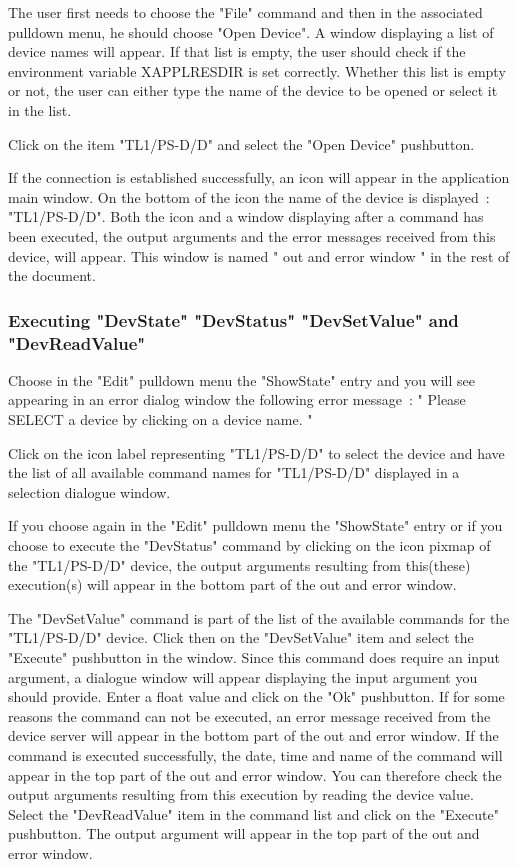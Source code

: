 The user first needs to choose the "File" command and then in the associated
pulldown menu, he should choose "Open Device". 
A window displaying a list of device names will appear. If that list is empty,  
the user should check if the environment variable XAPPLRESDIR is set correctly.
 Whether this list is empty or not, the user can either type the name of the  
device to be opened or select it in the list.

Click on the item "TL1/PS-D/D" and select the "Open Device"
pushbutton.

If the connection is established successfully, an icon will appear in the
application main window. On the bottom of the icon the name of the device is
displayed~: "TL1/PS-D/D". Both the icon and a window displaying 
after a command has been executed, the output 
arguments and the error messages received from this device, will appear. This 
window is named " out and error window " in the rest of the document.

\subsubsection{Executing "DevState" "DevStatus" "DevSetValue" and 
"DevReadValue"}

Choose in the "Edit" pulldown menu the "ShowState" entry and you will see 
appearing in an error dialog window the following error message~:
" Please SELECT a device by clicking on a device name. "

Click on the icon label representing "TL1/PS-D/D" to select the device 
and have the list of all available
command names for "TL1/PS-D/D" displayed in a selection dialogue window.

If you choose again in the "Edit" pulldown menu the "ShowState" entry or if 
you choose to execute the "DevStatus" command by clicking on the icon pixmap
of the "TL1/PS-D/D" device, the output arguments resulting from this(these) 
execution(s) will appear in the bottom part of the out and error window.

The "DevSetValue" command is part of the list of the available commands for
the "TL1/PS-D/D" device. Click then on the "DevSetValue" item and select
the "Execute" pushbutton in the window. Since this command does require 
an input argument, a dialogue window will appear displaying the input argument 
you should provide. Enter a float value and click on the "Ok" pushbutton. 
If for some reasons the command can not be executed, an error message received 
from the device server will appear in the bottom part of the out and error 
window. If the command is executed successfully, the date, time and name of the
command will appear in the top part of the out and error window. 
You can therefore check the output arguments resulting from this execution by 
reading the device value. Select the "DevReadValue" item in the command list 
and click on the "Execute" pushbutton. The output argument will appear in the 
top part of the out and error window.

